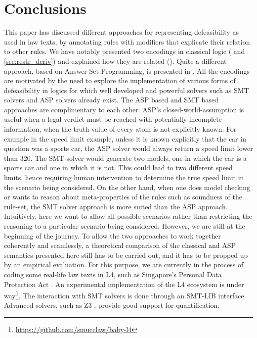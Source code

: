 \section{Conclusions}\label{sec:conclusions}

This paper has discussed different approaches for representing defeasibility
as used in law texts, by annotating rules with modifiers that explicate their
relation to other rules. We have notably presented two encodings in classical
logic ( and \ref{sec:restr_deriv}) and explained
how they are related (). Quite a different approach,
based on Answer Set Programming, is presented in
.  All the encodings are motivated by the need to explore the implementation of various forms of defeasibility in logics for which well developed and powerful solvers such as SMT solvers and ASP solvers already exist. The ASP based and SMT based approaches are complimentary to each other. ASP's closed-world-assumption is useful when a legal verdict must be reached with potentially incomplete information, when the truth value of every atom is not explicitly known. For example in the speed limit example, unless it is known explicitly that the car in question was a sports car, the ASP solver would always return a speed limit lower than $320$. The SMT solver would generate two models, one in which the car is a sports car and one in which it is not. This could lead to two different speed limits, hence requiring human intervention to determine the true speed limit in the scenario being considered. On the other hand, when one does model checking or wants to reason about meta-properties of the rules such as soundness of the rule-set, the SMT solver approach is more suited than the ASP approach. Intuitively, here we want to allow all possible scenarios rather than restricting the reasoning to a particular scenario being considered. However, we are still at the beginning of the journey. To allow the two approaches to work together coherently and seamlessly, a theoretical comparison of the classical and ASP semantics presented here still has to be carried out, and it has to be propped up by an empirical evaluation. For this purpose, we are currently in the process of coding some real-life law texts in L4, such as Singapore's Personal Data Protection Act \citep{ppda}.
An experimental implementation of the L4 ecosystem is under way\footnote{\url{https://github.com/smucclaw/baby-l4}}. The interaction with SMT solvers is done through an SMT-LIB \citep{BarFT_SMTLIB} interface. Advanced solvers, such as Z3 \citep{demoura_bjorner_z3_2008}, provide good support for quantification. 


